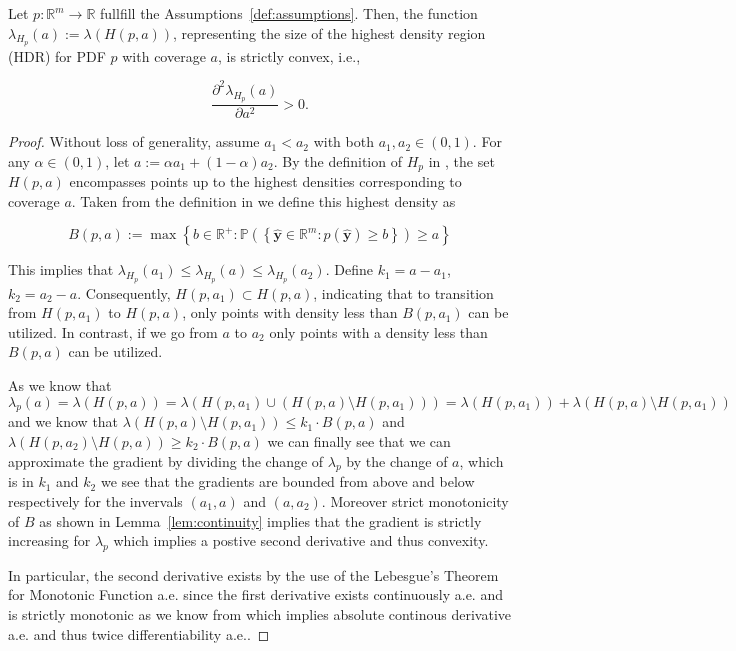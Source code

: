 \begin{lemma}
    Let \(p: \mathbb{R}^m \to \mathbb{R}\) fullfill the Assumptions~\ref{def:assumptions}. Then, the function \(\lambda_{H_p}(a) := \lambda(H(p, a))\), representing the size of the highest density region (HDR) for PDF \(p\) with coverage \(a\), is strictly convex, i.e.,

    \begin{equation}
        \frac{\partial^2 \lambda_{H_p}(a)}{\partial a^2} > 0.
    \end{equation}

\end{lemma}
\begin{proof}
    Without loss of generality, assume \(a_1 < a_2\) with both \(a_1, a_2 \in (0,1)\). For any \(\alpha \in (0, 1)\), let \(a := \alpha a_1 + (1-\alpha) a_2\). By the definition of \(H_p\) in , the set \(H(p, a)\) encompasses points up to the highest densities corresponding to coverage \(a\). Taken from the definition in  we define this highest density as

    \begin{equation}
        B(p, a):=\max \left\{b \in \mathbb{R^+}: \mathbb{P}\left(\left\{\mathbf{\hat{y}}
        \in
        \mathbb{R}^m: p(\mathbf{\hat{y}}) \geq b\right\}\right) \geq a
        \right\}
    \end{equation}

    This implies that \(\lambda_{H_p}(a_1) \leq \lambda_{H_p}(a) \leq \lambda_{H_p}(a_2)\). Define $k_1 = a-a_1$, $k_2 = a_2 - a$. Consequently, \(H(p, a_1) \subset H(p, a)\), indicating that to transition from \(H(p, a_1)\) to \(H(p, a)\), only points with density less than $B(p, a_1)$ can be utilized. In contrast, if we go from $a$ to $a_2$ only points with a density less than $B(p, a)$ can be utilized.

    As we know that
    \begin{equation}
        \lambda_p(a) = \lambda(H(p, a)) = \lambda(H(p, a_1) \cup (H(p,a)\setminus H(p,a_1))) = \lambda(H(p, a_1)) + \lambda(H(p,a)\setminus H(p, a_1))
    \end{equation}
    and we know that $\lambda(H(p,a)\setminus H(p, a_1)) \leq k_1 \cdot B(p, a)$ and $\lambda(H(p,a_2)\setminus H(p, a)) \geq k_2 \cdot B(p, a)$ we can finally see that we can approximate the gradient by dividing the change of $\lambda_p$ by the change of $a$, which is in $k_1$ and $k_2$ we see that the gradients are bounded from above and below respectively for the invervals $(a_1, a)$ and $(a, a_2)$. Moreover strict monotonicity of $B$ as shown in Lemma~\ref{lem:continuity} implies that the gradient is strictly increasing for $\lambda_p$ which implies a postive second derivative and thus convexity.

    In particular, the second derivative exists by the use of the Lebesgue's Theorem for Monotonic Function a.e. since the first derivative exists continuously a.e. and is strictly monotonic as we know from  which implies absolute continous derivative a.e. and thus twice differentiability a.e..
\end{proof}

